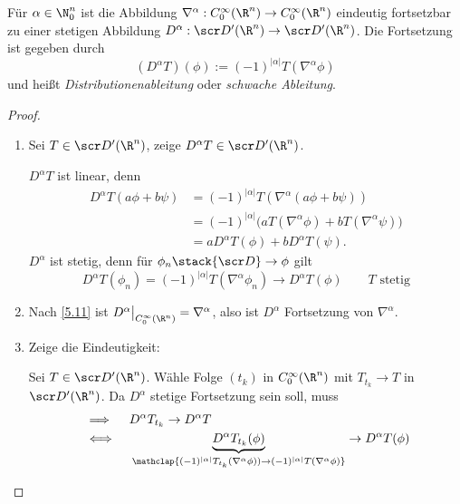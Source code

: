 \begin{st} \label{5.13}
	Für $\alpha \in \N_0^n$ ist die Abbildung $\nabla^\alpha: C_0^\infty(\R^n) \to C_0^\infty(\R^n)$ eindeutig fortsetzbar zu einer stetigen Abbildung $D^\alpha: \scr D'(\R^n) \to \scr D'(\R^n)$.
	Die Fortsetzung ist gegeben durch
	\[
		(D^\alpha T)(\phi) := (-1)^{|\alpha|} T(\nabla^\alpha \phi)
	\]
	und heißt \emph{Distributionenableitung} oder \emph{schwache Ableitung}.
	\begin{proof}
		\begin{enumerate}[1)]
			\item
				Sei $T \in \scr D'(\R^n)$, zeige $D^\alpha T \in \scr D'(\R^n)$.

				$D^\alpha T$ ist linear, denn
				\begin{align*}
					D^\alpha T(a \phi + b \psi)
					&= (-1)^{|\alpha|} T(\nabla^{\alpha}(a \phi + b\psi)) \\
					&= (-1)^{|\alpha|} \big( aT(\nabla^\alpha \phi) + bT(\nabla^\alpha \psi) \big) \\
					&= a D^\alpha T(\phi) + b D^\alpha T(\psi).
				\end{align*}
				$D^\alpha$ ist stetig, denn für $\phi_n \stack {\scr D}\to \phi$ gilt
				\[
					D^\alpha T(\phi_n)
					= (-1)^{|\alpha|} T(\nabla^\alpha \phi_n)
					\to D^\alpha T(\phi) \qquad \text{$T$ stetig}
				\]
			\item
				Nach \ref{5.11} ist $D^\alpha \big|_{C_0^\infty(\R^n)} = \nabla^\alpha$, also ist $D^\alpha$ Fortsetzung von $\nabla^\alpha$.
			\item
				Zeige die Eindeutigkeit:

				Sei $T \in \scr D'(\R^n)$.
				Wähle Folge $(t_k)$ in $C_0^\infty(\R^n)$ mit $T_{t_k} \to T$ in $\scr D'(\R^n)$.
				Da $D^\alpha$ stetige Fortsetzung sein soll, muss
				\begin{align*}
					&\implies \quad D^\alpha T_{t_k} \to D^\alpha T \\
					&\iff \quad \underbrace{D^\alpha T_{t_k}(\phi)}_{\mathclap{(-1)^{|\alpha|}T_{t_k}(\nabla^\alpha \phi)) \to (-1)^{|\alpha|}T(\nabla^\alpha \phi)}} \to D^\alpha T(\phi)
				\end{align*}
		\end{enumerate}
	\end{proof}
\end{st}


